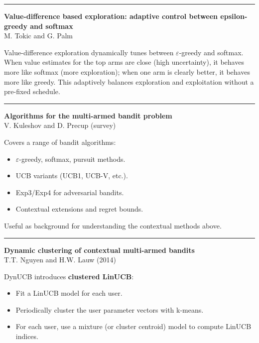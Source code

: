 \documentclass[a5paper]{article}
\providecommand{\tightlist}{%
  \setlength{\itemsep}{0pt}\setlength{\parskip}{0pt}}
\begin{document}
\begin{center}\rule{0.5\linewidth}{0.5pt}\end{center}

\textbf{Value-difference based exploration: adaptive control between
epsilon-greedy and softmax}\\
M. Tokic and G. Palm

Value-difference exploration dynamically tunes between $\varepsilon$-greedy and
softmax. When value estimates for the top arms are close (high
uncertainty), it behaves more like softmax (more exploration); when one
arm is clearly better, it behaves more like greedy. This adaptively
balances exploration and exploitation without a pre-fixed schedule.

\begin{center}\rule{0.5\linewidth}{0.5pt}\end{center}

\textbf{Algorithms for the multi-armed bandit problem}\\
V. Kuleshov and D. Precup (survey)

Covers a range of bandit algorithms:

\begin{itemize}
\tightlist
\item
  $\varepsilon$-greedy, softmax, pursuit methods.
\item
  UCB variants (UCB1, UCB-V, etc.).
\item
  Exp3/Exp4 for adversarial bandits.
\item
  Contextual extensions and regret bounds.
\end{itemize}

Useful as background for understanding the contextual methods above.

\begin{center}\rule{0.5\linewidth}{0.5pt}\end{center}

\textbf{Dynamic clustering of contextual multi-armed bandits}\\
T.T. Nguyen and H.W. Lauw (2014)

DynUCB introduces \textbf{clustered LinUCB}:

\begin{itemize}
\tightlist
\item
  Fit a LinUCB model for each user.
\item
  Periodically cluster the user parameter vectors with k-means.
\item
  For each user, use a mixture (or cluster centroid) model to compute
  LinUCB indices.
\end{itemize}
\end{document}
